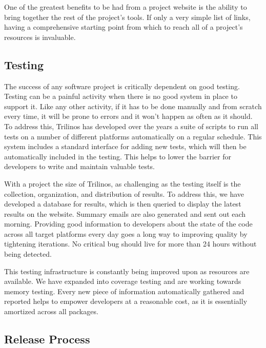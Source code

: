 \documentclass[12pt,relax]{article}
\begin{document}
One of the greatest benefits to be had from a project website is the ability to
bring together the rest of the project's tools.  If only a very simple list of
links, having a comprehensive starting point from which to reach all of a
project's resources is invaluable.

\subsection{Testing}


The success of any software project is critically dependent on good testing.
Testing can be a painful activity when there is no good system in place to
support it.  Like any other activity, if it has to be done manually and from
scratch every time, it will be prone to errors and it won't happen as often as
it should.  To address this, Trilinos has developed over the years a suite of
scripts to run all tests on a number of different platforms automatically on a
regular schedule.  This system includes a standard interface for adding new
tests, which will then be automatically included in the testing.  This helps
to lower the barrier for developers to write and maintain valuable tests.

With a project the size of Trilinos, as challenging as the testing itself is
the collection, organization, and distribution of results.  To address this,
we have developed a database for results, which is then queried to display the
latest results on the website.  Summary emails are also generated and sent out
each morning.  Providing good information to developers about the state of the
code across all target platforms every day goes a long way to improving
quality by tightening iterations.  No critical bug should live for more
than 24 hours without being detected.

This testing infrastructure is constantly being improved upon as resources are
available.  We have expanded into coverage testing and are working towards
memory testing.  Every new piece of information automatically gathered and
reported helps to empower developers at a reasonable cost, as it is essentially
amortized across all packages.

\subsection{Release Process}
\end{document}
